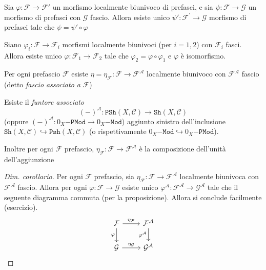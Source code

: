 \begin{proposition}{}
    Sia \(\varphi : \mathcal{F} \to \mathcal{F}'\) un morfismo localmente
    biunivoco di prefasci, e sia \(\psi : \mathcal{F} \to \mathcal{G}\) un
    morfismo di prefasci con \(\mathcal{G}\) fascio. Allora esiste unico \(\psi'
    : \mathcal{F}^{\prime} \to \mathcal{G}\) morfismo di prefasci tale che
    \(\psi = \psi' \circ \varphi \) 
\end{proposition}

\begin{corollary}{}
    Siano \(\varphi_i : \mathcal{F} \to \mathcal{F}_i\) morfismi localmente
    biunivoci (per \(i=1,2\)) con \(\mathcal{F}_i\) fasci. Allora esiste unico
    \(\varphi : \mathcal{F}_1 \to \mathcal{F}_2\) tale che \(\varphi_{2} =
    \varphi  \circ \varphi_{1}\) e \(\varphi \) è isomorfismo.
\end{corollary}

\begin{proposition}{}
    Per ogni prefascio \(\mathcal{F}\) esiste \(\eta = \eta_\mathcal{F} :
    \mathcal{F} \to \mathcal{F}^{\mathcal{A}}\) localmente biunivoco con
    \(\mathcal{F}^{\mathcal{A}}\) fascio (detto \emph{fascio associato a}
    \(\mathcal{F}\))
\end{proposition}

\begin{corollary}{}
    Esiste il \emph{funtore associato}
    \[
      {(-)}^{\mathcal{A}} : \mathtt{PSh}{(X, \mathcal{C})} \to \mathtt{Sh}{(X,
      \mathcal{C})}
    \]
    (oppure \({(-)}^{\mathcal{A}} : 0_X\mathtt{-PMod} \to 0_X\mathtt{-Mod}\))
    aggiunto sinistro dell'inclusione \(\mathtt{Sh}{(X, \mathcal{C})}
    \hookrightarrow \mathtt{Psh}{(X, \mathcal{C})}\) (o rispettivamente
    \(0_X\mathtt{-Mod} \hookrightarrow 0_X\mathtt{-PMod}\)).

    Inoltre per ogni \(\mathcal{F}\) prefascio, \(\eta_\mathcal{F} : \mathcal{F}
    \to \mathcal{F}^{\mathcal{A}}\) è la composizione dell'unità
    dell'aggiunzione
\end{corollary}

\begin{proof}[Dim. corollario]
    Per ogni \(\mathcal{F}\) prefascio, sia \(\eta_\mathcal{F} : \mathcal{F} \to
    \mathcal{F}^{\mathcal{A}}\) localmente biunivoca con
    \(\mathcal{F}^{\mathcal{A}}\) fascio. Allora per ogni \(\varphi  :
    \mathcal{F} \to \mathcal{G}\) esiste unico \(\varphi ^{\mathcal{A}} :
    \mathcal{F} ^{\mathcal{A}} \to \mathcal{G}^{\mathcal{A}}\) tale che il
    seguente diagramma commuta (per la proposizione). Allora si conclude
    facilmente (esercizio).
\[\begin{tikzcd}
	{\mathcal{F}} & {\mathcal{F}^\mathcal{A}} \\
	{\mathcal{G}} & {\mathcal{G}^\mathcal{A}}
	\arrow["{\eta_\mathcal{F}}", from=1-1, to=1-2]
	\arrow["\varphi"', from=1-1, to=2-1]
	\arrow["{\varphi^\mathcal{A}}"', from=1-2, to=2-2]
	\arrow["{\eta_\mathcal{G}}", from=2-1, to=2-2]
\end{tikzcd}\]
\end{proof}


